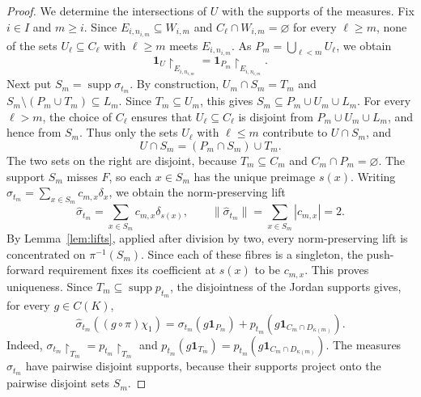 \documentclass[a4paper,11pt]{amsart}
\theoremstyle{plain}
\theoremstyle{definition}
\theoremstyle{remark}
\newcommand{\supp}{\operatorname{supp}}
\newcommand{\one}{\mathbf 1}
\newcommand{\restr}[1]{{\restriction_{#1}}}
\numberwithin{equation}{section}
\begin{document}
\begin{proof}
We determine the intersections of $U$ with the supports of the measures.
Fix $i\in I$ and $m\geqslant i$. Since $E_{i,n_{i,m}}\subseteq W_{i,m}$
and $C_\ell\cap W_{i,m}=\varnothing$ for every $\ell\geqslant m$,
none of the sets $U_\ell\subseteq C_\ell$ with $\ell\geqslant m$
meets $E_{i,n_{i,m}}$. As $P_m=\bigcup_{\ell<m}U_\ell$, we obtain
\begin{equation}\label{eq:old-selector-identity}
 \one_U\restr{E_{i,n_{i,m}}}
 =\one_{P_m}\restr{E_{i,n_{i,m}}}.
\end{equation}
Next put $S_m=\supp\sigma_{t_m}$. By construction,
$U_m\cap S_m=T_m$ and $S_m\setminus(P_m\cup T_m)\subseteq L_m$.
Since $T_m\subseteq U_m$, this gives
$S_m\subseteq P_m\cup U_m\cup L_m$.
For every $\ell>m$, the choice of $C_\ell$ ensures that
$U_\ell\subseteq C_\ell$ is disjoint from $P_m\cup U_m\cup L_m$,
and hence from $S_m$. Thus only the sets $U_\ell$ with $\ell\leqslant m$
contribute to $U\cap S_m$, and
\[
 U\cap S_m=(P_m\cap S_m)\cup T_m.
\]
The two sets on the right are disjoint, because
$T_m\subseteq C_m$ and $C_m\cap P_m=\varnothing$.
The support $S_m$ misses $F$, so each $x\in S_m$ has the unique
preimage $s(x)$. Writing $\sigma_{t_m}=\sum_{x\in S_m}c_{m,x}\delta_x$,
we obtain the norm-preserving lift
\[
 \widehat\sigma_{t_m}=\sum_{x\in S_m}c_{m,x}\delta_{s(x)},
 \qquad \|\widehat\sigma_{t_m}\|=
 \sum_{x\in S_m}|c_{m,x}|=2.
\]
By Lemma~\ref{lem:lifts}, applied after division by two, every
norm-preserving lift is concentrated on $\pi^{-1}(S_m)$.
Since each of these fibres is a singleton, the push-forward requirement
fixes its coefficient at $s(x)$ to be $c_{m,x}$. This proves uniqueness.
Since $T_m\subseteq\supp p_{t_m}$, the disjointness of the Jordan
supports gives, for every $g\in C(K)$,
\begin{equation}\label{eq:fresh-selector-identity}
 \widehat\sigma_{t_m}((g\circ\pi)\chi_1)
 =\sigma_{t_m}(g\one_{P_m})
       +p_{t_m}(g\one_{C_m\cap D_{\kappa(m)}}).
\end{equation}
Indeed, $\sigma_{t_m}\restr{T_m}=p_{t_m}\restr{T_m}$ and
$p_{t_m}(g\one_{T_m})=p_{t_m}(g\one_{C_m\cap D_{\kappa(m)}})$.
The measures $\widehat\sigma_{t_m}$ have pairwise disjoint supports,
because their supports project onto the pairwise disjoint sets $S_m$.


\end{proof}
\end{document}
